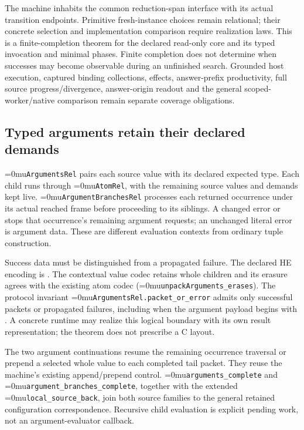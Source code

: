 \documentclass[11pt,a4paper]{article}
\newcommand{\code}[1]{\texttt{\detokenize{#1}}}
\newcommand{\name}[1]{\textup{\Urlmuskip=0mu\relax\nolinkurl{#1}}}
\begin{document}
The machine inhabits the common reduction-span interface with its actual
transition endpoints. Primitive fresh-instance choices remain relational;
their concrete selection and implementation comparison require realization
laws. This is a finite-completion theorem for the declared read-only core and
its typed invocation and minimal phases.
Finite completion does not determine when successes may become observable
during an unfinished search. Grounded host execution, captured binding
collections, effects,
answer-prefix productivity, full source progress/divergence, answer-origin
readout and the general scoped-worker/native comparison remain separate
coverage obligations.

\subsection*{Typed arguments retain their declared demands}

\name{ArgumentsRel} pairs each source value with its declared expected type.
Each child runs through \name{AtomRel}, with the remaining source values and
demands kept live. \name{ArgumentBranchesRel} processes each returned occurrence
under its actual reached frame before proceeding to its siblings. A changed
error or \code{Empty} stops that occurrence's remaining argument requests;
an unchanged literal error is argument data. These are different evaluation
contexts from ordinary tuple construction.

Success data must be distinguished from a propagated failure. The declared
HE encoding is \code{(Ok (arguments ...))}. The contextual value codec retains
whole children and its erasure agrees with the existing atom codec
(\name{unpackArguments_erases}). The protocol invariant
\name{ArgumentsRel.packet_or_error} admits only successful packets or
propagated failures, including when the argument payload begins with
\code{Error}. A concrete runtime may realize this logical boundary with its
own result representation; the theorem does not prescribe a C layout.

The two argument continuations resume the remaining occurrence traversal or
prepend a selected whole value to each completed tail packet. They reuse
the machine's existing append/prepend control. \name{arguments_complete} and
\name{argument_branches_complete}, together with the extended
\name{local_source_back}, join both source families to the general retained
configuration correspondence. Recursive child evaluation is explicit pending
work, not an argument-evaluator callback.
\end{document}
